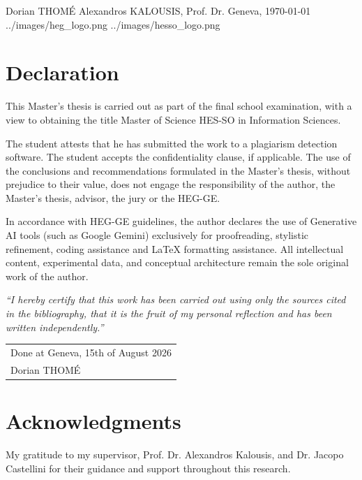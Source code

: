 \documentclass[11pt, a4paper]{article}
\title{\fulltitle}
\author{\authorname}
\date{\today}
\newcommand{\authorname}{Dorian THOMÉ}
\begin{document}
\makeHEGtitle
    {\authorname}
    {Alexandros KALOUSIS, Prof. Dr.}
    {Geneva, \today}
    {../images/heg_logo.png} 
    {../images/hesso_logo.png}

\section*{Declaration} %
This Master’s thesis is carried out as part of the final school examination, with a view to obtaining the title Master of Science HES-SO in Information Sciences.

The student attests that he has submitted the work to a plagiarism detection software. The student accepts the confidentiality clause, if applicable. The use of the conclusions and recommendations formulated in the Master’s thesis, without prejudice to their value, does not engage the responsibility of the author, the Master’s thesis, advisor, the jury or the HEG-GE.

In accordance with HEG-GE guidelines, the author declares the use of Generative AI tools (such as Google Gemini) exclusively for proofreading, stylistic refinement, coding assistance and LaTeX formatting assistance. All intellectual content, experimental data, and conceptual architecture remain the sole original work of the author.

\textit{“I hereby certify that this work has been carried out using only the sources cited in the bibliography, that it is the fruit of my personal reflection and has been written independently.”}

\vspace{1.5cm}
\hfill
\begin{tabular}{l}
Done at Geneva, 15th of August 2026 \\[0.5cm]
Dorian THOMÉ
\end{tabular}

\newpage

\section*{Acknowledgments}
My gratitude to my supervisor, Prof. Dr. Alexandros Kalousis, and Dr. Jacopo Castellini for their guidance and support throughout this research.
\end{document}
